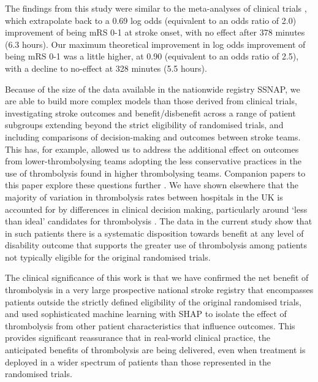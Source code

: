 
The findings from this study were similar to the meta-analyses of clinical trials \cite{emberson_effect_2014}, which extrapolate back to a 0.69 log odds (equivalent to an odds ratio of 2.0) improvement of being mRS 0-1 at stroke onset, with no effect after 378 minutes (6.3 hours). Our maximum theoretical improvement in log odds improvement of being mRS 0-1 was a little higher, at 0.90 (equivalent to an odds ratio of 2.5), with a decline to no-effect at 328 minutes (5.5 hours).

Because of the size of the data available in the nationwide registry SSNAP, we are able to build more complex models than those derived from clinical trials, investigating stroke outcomes and benefit/disbenefit across a range of patient subgroups extending beyond the strict eligibility of randomised trials, and including comparisons of decision-making and outcomes between stroke teams.  This has, for example, allowed us to address the additional effect on outcomes from lower-thrombolysing teams adopting the less conservative practices in the use of thrombolysis found in higher thrombolysing teams. Companion papers to this paper explore these questions further \cite{pearn_are_2024, pearn_identifying_2024}. We have shown elsewhere that the majority of variation in thrombolysis rates between hospitals in the UK is accounted for by differences in clinical decision making, particularly around ‘less than ideal’ candidates for thrombolysis \cite{allen_use_2022, allen_using_2022, pearn_identifying_2024}.  The data in the current study show that in such patients there is a systematic disposition towards benefit at any level of disability outcome that supports the greater use of thrombolysis among patients not typically eligible for the original randomised trials.


The clinical significance of this work is that we have confirmed the net benefit of thrombolysis in a very large prospective national stroke registry that encompasses patients outside the strictly defined eligibility of the original randomised trials, and used sophisticated machine learning with SHAP to isolate the effect of thrombolysis from other patient characteristics that influence outcomes.  This provides significant reassurance that in real-world clinical practice, the anticipated benefits of thrombolysis are being delivered, even when treatment is deployed in a wider spectrum of patients than those represented in the randomised trials.


